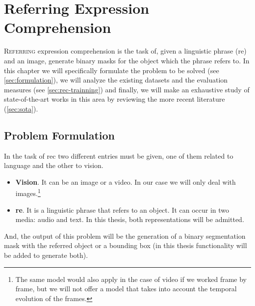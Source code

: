 

\chapter{Referring Expression Comprehension}%
\label{cha:rec}



\lettrine{R}{eferring} expression comprehension is the task of, given a
linguistic phrase (\gls{re}) and an image, generate binary masks for the object
which the phrase refers to. In this chapter we will specifically formulate the
problem to be solved (see \vref{sec:formulation}), we will analyze the existing
datasets and the evaluation measures (see \vref{sec:rec-trainning}) and
finally, we will make an exhaustive study of state-of-the-art works in this
area by reviewing the more recent literature (\vref{sec:sota}).



\section{Problem Formulation}\label{sec:formulation}

In the task of \gls{rec} two different entries must be given, one of them
related to language and the other to vision.
\begin{itemize}
  \item \textbf{Vision}. It can be an image or a video. In our case we will
  only deal with images.\footnote{The same model would also apply in the case
    of video if we worked frame by frame, but we will not offer a model that
    takes into account the temporal evolution of the frames.}
  \item \textbf{\gls{re}}. It is a linguistic phrase that refers to an
  object. It can occur in two media: audio and text. In this thesis, both
  representations will be admitted.
\end{itemize}
And, the output of this problem will be the generation of a binary segmentation
mask with the referred object or a bounding box (in this thesis functionality
will be added to generate both).

